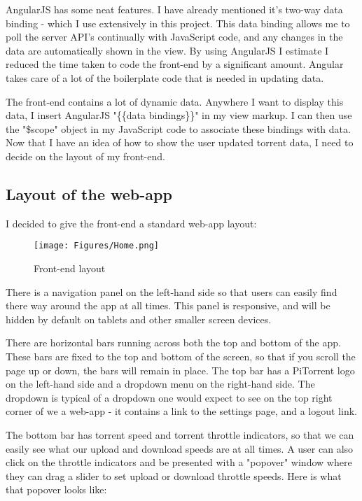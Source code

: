 AngularJS has some neat features. I have already mentioned it's two-way data binding - which I use extensively in this project. This data binding allows me to poll the server API's continually with JavaScript code, and any changes in the data are automatically shown in the view. By using AngularJS I estimate I reduced the time taken to code the front-end by a significant amount. Angular takes care of a lot of the boilerplate code that is needed in updating data.

The front-end contains a lot of dynamic data. Anywhere I want to display this data, I insert AngularJS "\{\{data bindings\}\}" in my view markup. I can then use the "\$scope" object in my JavaScript code to associate these bindings with data. Now that I have an idea of how to show the user updated torrent data, I need to decide on the layout of my front-end.

\subsection{Layout of the web-app}
I decided to give the front-end a standard web-app layout:

\vspace{10px}
\begin{figure}[h!]
  \centering
    \texttt{[image: Figures/Home.png]}
  \caption{Front-end layout}
\end{figure}

There is a navigation panel on the left-hand side so that users can easily find there way around the app at all times. This panel is responsive, and will be hidden by default on tablets and other smaller screen devices. 

There are horizontal bars running across both the top and bottom of the app. These bars are fixed to the top and bottom of the screen, so that if you scroll the page up or down, the bars will remain in place. The top bar has a PiTorrent logo on the left-hand side and a dropdown menu on the right-hand side. The dropdown is typical of a dropdown one would expect to see on the top right corner of we a web-app - it contains a link to the settings page, and a logout link. 

The bottom bar has torrent speed and torrent throttle indicators, so that we can easily see what our upload and download speeds are at all times. A user can also click on the throttle indicators and be presented with a "popover" window where they can drag a slider to set upload or download throttle speeds. Here is what that popover looks like:


